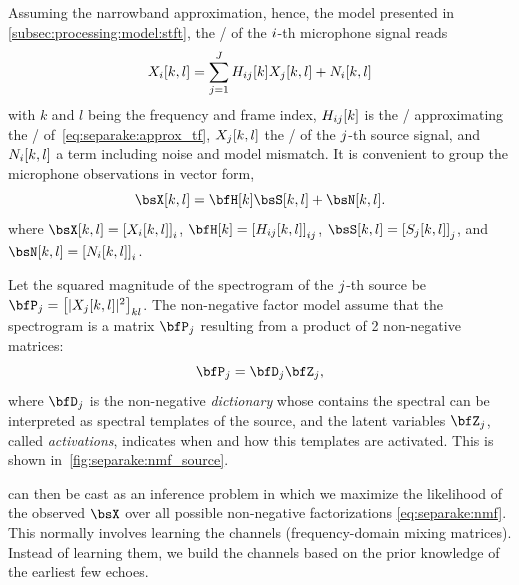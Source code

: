 \mynewline
Assuming the narrowband approximation, hence, the model presented in \cref{subsec:processing:model:stft}, the \STFTdef/ of the $i$-th microphone signal reads
\begin{equation}
    \label{eq:separake:stft}
    X_{i}[k,l] = \sum_{j = 1}^{J} H_{ij}[k] X_{j}[k,l] + N_{i}[k,l]
\end{equation}
with $k$ and $l$ being the frequency and frame index,
$H_{ij}[k]$ is the \DFT/ approximating the \RTF/ of~\eqref{eq:separake:approx_tf},
$X_{j}[k,l]$ the \STFT/ of the $j$-th source signal, and $N_{i}[k,l]$ a term including noise and model mismatch.
It is convenient to group the microphone observations in vector form,
\begin{equation}
    \MICS[k,l] = \FLTSS[k]\SRCS[k,l] + \NSES[k,l].
\end{equation}
where $\MICS[k,l] = \klist{\MIC_\idxMic[k,l]}_\idxMic$,
$\FLTSS[k] = \klist{H_{\idxMicSrc}[k,l]}_{\idxMicSrc}$,
$\SRCS[k,l] = \klist{\SRC_\idxSrc[k,l]}_\idxSrc$,
and $\NSES[k,l] = \klist{\NSE_\idxMic[k,l]}_\idxMic$.

\mynewline
Let the squared magnitude of the spectrogram of the $j$-th source be $\mP_\idxSrc = \klist{\powerOf{\MIC_{\idxSrc}[k,l]} }_{kl}$.
The non-negative factor model assume that the spectrogram is a matrix $\mP_\idxSrc$ resulting from a product of 2 non-negative matrices:
\begin{equation}
    \label{eq:separake:nmf}
    \mP_\idxSrc =  \mD_\idxSrc \mZ_\idxSrc,
\end{equation}
where $\mD_\idxSrc$ is the non-negative \textit{dictionary} whose contains the spectral can be interpreted as spectral templates of the source,
and the latent variables $\mZ_\idxSrc$, called \textit{activations}, indicates when and how this templates are activated.
This is shown in~\cref{fig:separake:nmf_source}.

 can then be cast as an inference problem in which we maximize the likelihood of the observed $\MICS$ over all possible non-negative factorizations \eqref{eq:separake:nmf}.
This normally involves learning the channels (frequency-domain mixing matrices).
Instead of learning them, we build the channels based on the prior knowledge of the earliest few echoes.


